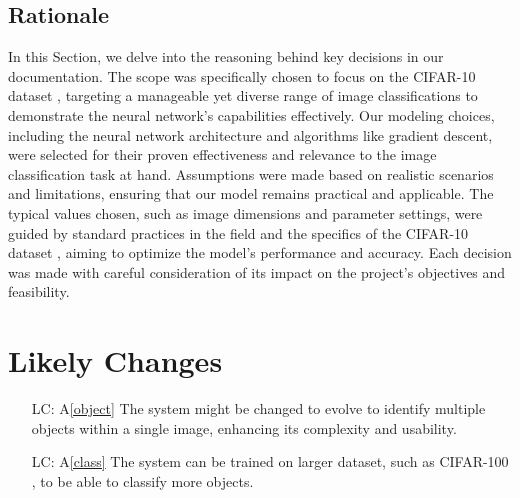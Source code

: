 \documentclass[12pt]{article}
\newcommand{\aref}[1]{A\ref{#1}}
\newcounter{lcnum} %
\begin{document}
\subsection{Rationale}

In this Section, we delve into the reasoning behind key decisions in our documentation. 
The scope was specifically chosen to focus on the CIFAR-10 dataset \cite{CIFAR}, targeting a manageable 
yet diverse range of image classifications to demonstrate the neural network's capabilities 
effectively. Our modeling choices, including the neural network architecture and algorithms 
like gradient descent, were selected for their proven effectiveness and relevance to the 
image classification task at hand. Assumptions were made based on realistic scenarios and 
limitations, ensuring that our model remains practical and applicable. The typical 
values chosen, such as image dimensions and parameter settings, were guided by 
standard practices in the field and the specifics of the CIFAR-10 dataset \cite{CIFAR}, aiming to 
optimize the model's performance and accuracy. Each decision was made with careful 
consideration of its impact on the project's objectives and feasibility.


\section{Likely Changes}    

\noindent \begin{itemize}

\item[LC\refstepcounter{lcnum}\thelcnum\label{LC_object}:] 
\aref{object} The system might be changed to evolve to identify multiple objects within a 
single image, enhancing its complexity and usability.

\item[LC\refstepcounter{lcnum}\thelcnum\label{LC_class}:] 
\aref{class} The system can be trained on larger dataset, such as CIFAR-100 \cite{CIFAR}, 
to be able to classify more objects.


\end{itemize}
\end{document}
